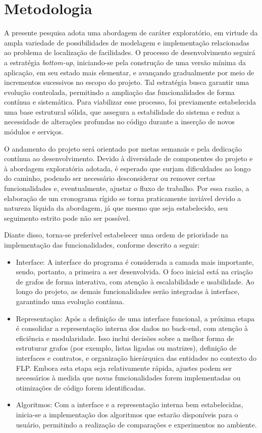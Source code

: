 \chapter{Metodologia}

A presente pesquisa adota uma abordagem de caráter exploratório, em virtude da ampla variedade de possibilidades de modelagem e implementação relacionadas ao problema de localização de facilidades. O processo de desenvolvimento seguirá a estratégia \textit{bottom-up}, iniciando-se pela construção de uma versão mínima da aplicação, em seu estado mais elementar, e avançando gradualmente por meio de incrementos sucessivos no escopo do projeto. Tal estratégia busca garantir uma evolução controlada, permitindo a ampliação das funcionalidades de forma contínua e sistemática. Para viabilizar esse processo, foi previamente estabelecida uma base estrutural sólida, que assegura a estabilidade do sistema e reduz a necessidade de alterações profundas no código durante a inserção de novos módulos e serviços. 

O andamento do projeto será orientado por metas semanais e pela dedicação contínua ao desenvolvimento. Devido à diversidade de componentes do projeto e à abordagem exploratória adotada, é esperado que surjam dificuldades ao longo do caminho, podendo ser necessário desconsiderar ou remover certas funcionalidades e, eventualmente, ajustar o fluxo de trabalho. Por essa razão, a elaboração de um cronograma rígido se torna praticamente inviável devido a natureza líquida da abordagem, já que mesmo que seja estabelecido, seu seguimento estrito pode não ser possível.

Diante disso, torna-se preferível estabelecer uma ordem de prioridade na implementação das funcionalidades, conforme descrito a seguir:
\begin{itemize}
    \item Interface: A interface do programa é considerada a camada mais importante, sendo, portanto, a primeira a ser desenvolvida. O foco inicial está na criação de grafos de forma interativa, com atenção à escalabilidade e usabilidade. Ao longo do projeto, as demais funcionalidades serão integradas à interface, garantindo uma evolução contínua.
    \item Representação: Após a definição de uma interface funcional, a próxima etapa é consolidar a representação interna dos dados no back-end, com atenção à eficiência e modularidade. Isso inclui decisões sobre a melhor forma de estruturar grafos (por exemplo, listas ligadas ou matrizes), definição de interfaces e contratos, e organização hierárquica das entidades no contexto do FLP. Embora esta etapa seja relativamente rápida, ajustes podem ser necessários à medida que novas funcionalidades forem implementadas ou otimizações de código forem identificadas.
    \item Algoritmos: Com a interface e a representação interna bem estabelecidas, inicia-se a implementação dos algoritmos que estarão disponíveis para o usuário, permitindo a realização de comparações e experimentos no ambiente.
\end{itemize}

